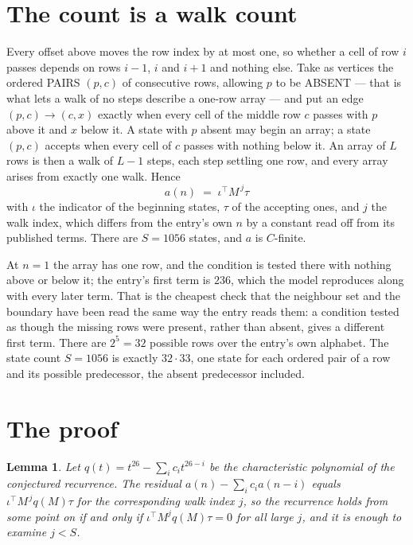 \documentclass[11pt,a4paper]{article}
\theoremstyle{plain}
\newtheorem{lemma}[theorem]{Lemma}
\theoremstyle{definition}
\begin{document}
\section{The count is a walk count}

Every offset above moves the row index by at most one, so whether a cell of row $i$ passes
depends on rows $i-1$, $i$ and $i+1$ and nothing else. Take as vertices the ordered PAIRS
$(p,c)$ of consecutive rows, allowing $p$ to be ABSENT --- that is what lets a walk of no steps
describe a one-row array --- and put an edge $(p,c)\to(c,x)$ exactly when every cell of the
middle row $c$ passes with $p$ above it and $x$ below it. A state with $p$ absent may begin an
array; a state $(p,c)$ accepts when every cell of $c$ passes with nothing below it. An array of
$L$ rows is then a walk of $L-1$ steps, each step settling one row, and every array arises from
exactly one walk. Hence
\[
a(n)\;=\;\iota^{\!\top}M^{\,j}\tau
\]
with $\iota$ the indicator of the beginning states, $\tau$ of the accepting ones, and $j$ the
walk index, which differs from the entry's own $n$ by a constant read off from its published
terms. There are $S=1056$ states, and $a$ is $C$-finite.

At $n=1$ the array has one row, and
the condition is tested there with nothing above or below it; the entry's first term is
$236$, which the model reproduces along with every later term. That is the cheapest check
that the neighbour set and the boundary have been read the same way the entry reads them: a
condition tested as though the missing rows were present, rather than absent, gives a different
first term. There are $2^{5}=32$ possible rows over the entry's own alphabet. The state count $S=1056$ is exactly $32\cdot33$,
one state for each ordered pair of a row and its possible predecessor, the absent predecessor
included.

\section{The proof}

\begin{lemma}\label{lem:crit}
Let $q(t)=t^{26}-\sum_i c_it^{26-i}$ be the characteristic polynomial of the
conjectured recurrence. The residual $a(n)-\sum_ic_ia(n-i)$ equals
$\iota^{\!\top}M^{\,j}q(M)\tau$ for the corresponding walk index $j$, so the recurrence
holds from some point on if and only if $\iota^{\!\top}M^{j}q(M)\tau=0$ for all large $j$,
and it is enough to examine $j<S$.
\end{lemma}
\end{document}
